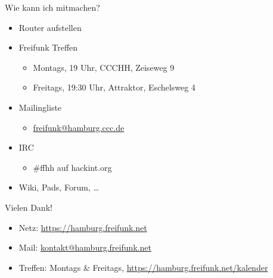 \documentclass[t]{beamer}
\begin{document}
  \begin{frame}{Wie kann ich mitmachen?}
    \begin{itemize}
      \item Router aufstellen
      \item Freifunk Treffen
      \begin{itemize}
       \item Montags, 19 Uhr, CCCHH, Zeiseweg 9
       \item Freitags, 19:30 Uhr, Attraktor, Eschelsweg 4
      \end{itemize}
      \item Mailingliste
      \begin{itemize}
       \item \href{mailto:freifunk@hamburg.ccc.de}{freifunk@hamburg.ccc.de}
      \end{itemize}
      \item IRC
      \begin{itemize}
       \item \#ffhh auf hackint.org
      \end{itemize}
      \item Wiki, Pads, Forum, \ldots
    \end{itemize}
  \end{frame}
  
  \begin{frame}{Vielen Dank!}
    \begin{center}
      
    \end{center}
    \begin{itemize}
      \item Netz: \href{https://hamburg.freifunk.net}{https://hamburg.freifunk.net}
      \item Mail: \href{mailto:kontakt@hamburg.freifunk.net}{kontakt@hamburg.freifunk.net}
      \item Treffen: Montags \& Freitags, \href{https://hamburg.freifunk.net/kalender}{https://hamburg.freifunk.net/kalender}
    \end{itemize}
  \end{frame}
  
\end{document}
